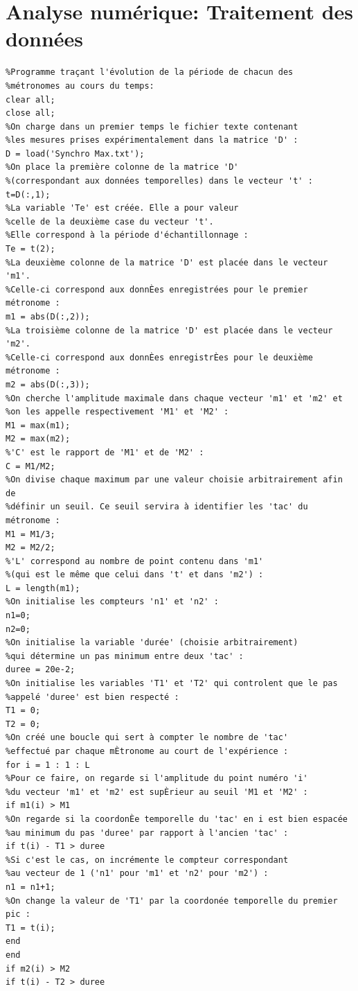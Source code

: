 \documentclass[a4paper,11pt]{report}
\begin{document}
\chapter{Analyse numérique: Traitement des données}
\label{Traitement}
\begin{verbatim}
%Programme traçant l'évolution de la période de chacun des 
%métronomes au cours du temps:
clear all;
close all;
%On charge dans un premier temps le fichier texte contenant
%les mesures prises expérimentalement dans la matrice 'D' :
D = load('Synchro Max.txt');
%On place la première colonne de la matrice 'D'
%(correspondant aux données temporelles) dans le vecteur 't' :
t=D(:,1);
%La variable 'Te' est créée. Elle a pour valeur
%celle de la deuxième case du vecteur 't'.
%Elle correspond à la période d'échantillonnage :
Te = t(2);
%La deuxième colonne de la matrice 'D' est placée dans le vecteur 'm1'.
%Celle-ci correspond aux donnÈes enregistrées pour le premier métronome :
m1 = abs(D(:,2));
%La troisième colonne de la matrice 'D' est placée dans le vecteur 'm2'.
%Celle-ci correspond aux donnÈes enregistrÈes pour le deuxième métronome :
m2 = abs(D(:,3));
%On cherche l'amplitude maximale dans chaque vecteur 'm1' et 'm2' et
%on les appelle respectivement 'M1' et 'M2' :
M1 = max(m1);
M2 = max(m2);
%'C' est le rapport de 'M1' et de 'M2' :
C = M1/M2;
%On divise chaque maximum par une valeur choisie arbitrairement afin de
%définir un seuil. Ce seuil servira à identifier les 'tac' du métronome :
M1 = M1/3;
M2 = M2/2;
%'L' correspond au nombre de point contenu dans 'm1'
%(qui est le même que celui dans 't' et dans 'm2') :
L = length(m1);
%On initialise les compteurs 'n1' et 'n2' :
n1=0;
n2=0;
%On initialise la variable 'durée' (choisie arbitrairement)
%qui détermine un pas minimum entre deux 'tac' :
duree = 20e-2;
%On initialise les variables 'T1' et 'T2' qui controlent que le pas
%appelé 'duree' est bien respecté :
T1 = 0;
T2 = 0;
%On créé une boucle qui sert à compter le nombre de 'tac'
%effectué par chaque mÈtronome au court de l'expérience :
for i = 1 : 1 : L
%Pour ce faire, on regarde si l'amplitude du point numéro 'i'
%du vecteur 'm1' et 'm2' est supÈrieur au seuil 'M1 et 'M2' :
if m1(i) > M1
%On regarde si la coordonÈe temporelle du 'tac' en i est bien espacée
%au minimum du pas 'duree' par rapport à l'ancien 'tac' :
if t(i) - T1 > duree
%Si c'est le cas, on incrémente le compteur correspondant
%au vecteur de 1 ('n1' pour 'm1' et 'n2' pour 'm2') :
n1 = n1+1;
%On change la valeur de 'T1' par la coordonée temporelle du premier pic :
T1 = t(i);
end
end
if m2(i) > M2
if t(i) - T2 > duree

\end{verbatim}
\end{document}
